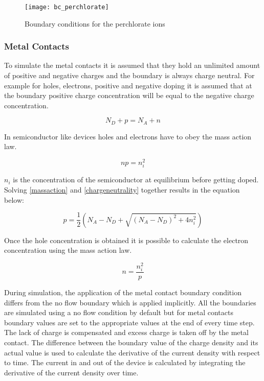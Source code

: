 \begin{doublespace}
\begin{figure}[!htp]
\centering
\texttt{[image: bc\_perchlorate]}
\caption{Boundary conditions for the perchlorate ions } 
\label{bc_perchlorate}
\end{figure}

\clearpage
\subsubsection{Metal Contacts}
To simulate the metal contacts it is assumed that they hold an unlimited amount of positive and negative charges and the boundary is always charge neutral. For example for holes, electrons, positive and negative doping it is assumed that at the boundary positive charge concentration will be equal to the negative charge concentration. 

\begin{equation}
N_{D} + p=N_{A} + n
\label{chargeneutrality}
\end{equation}

In semiconductor like devices holes and electrons have to obey the mass action law.

\begin{equation}
np=n_i^2
\label{massaction}
\end{equation}

$n_i$ is the concentration of the semiconductor at equilibrium before getting doped. Solving \eqref{massaction} and \eqref{chargeneutrality} together results in the equation below:

\begin{equation}
p=\frac{1}{2}(N_A - N_D + \sqrt{(N_A - N_D)^2+4n_i^2})
\label{nbound}
\end{equation}

Once the hole concentration is obtained it is possible to calculate the electron concentration using the mass action law.

\begin{equation}
n=\frac{n_i^2}{p}
\label{pbound}
\end{equation}

During simulation, the application of the metal contact boundary condition differs from the no flow boundary which is applied implicitly. All the boundaries are simulated using a no flow condition by default but for metal contacts boundary values are set to the appropriate values at the end of every time step. The lack of charge is compensated and excess charge is taken off by the metal contact. The difference between the boundary value of the charge density and its actual value is used to calculate the derivative of the current density with respect to time. The current in and out of the device is calculated by integrating the derivative of the current density over time. 


\end{doublespace}
